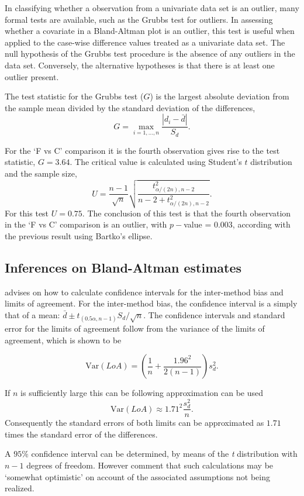 \documentclass[12pt, a4paper]{report}
\begin{document}
	In classifying whether a observation from a univariate data set is
	an outlier, many formal tests are available, such as the Grubbs test for outliers. In assessing
	whether a covariate in a Bland-Altman plot is an outlier, this
	test is useful when applied to the case-wise difference values treated as a
	univariate data set. The null hypothesis of the Grubbs test procedure is the absence
	of any outliers in the data set. Conversely, the alternative hypotheses is that there is at least one outlier
	present.
	
	The test statistic for the Grubbs test ($G$) is the largest
	absolute deviation from the sample mean divided by the standard
	deviation of the differences,
	\[
	G =  \displaystyle\max_{i=1,\ldots, n}\frac{\left \vert d_i -
		\bar{d}\right\vert}{S_{d}}.
	\]
	
	For the `F vs C' comparison it is the fourth observation gives
	rise to the test statistic, $G = 3.64$. The critical value is
	calculated using Student's $t$ distribution and the sample size,
	\[
	U = \frac{n-1}{\sqrt{n}} \sqrt{\frac{t_{\alpha/(2n),n-2}^2}{n - 2
			+ t_{\alpha/(2n),n-2}^2}}.
	\]
	For this test $U = 0.75$. The conclusion of this test is that the fourth observation in the `F vs C' comparison is an outlier, with $p-$value = 0.003, according with the previous result using Bartko's ellipse.
	
	\newpage
	
	
	
	\subsection{Inferences on Bland-Altman estimates}
	\citet*{BA99}advises on how to calculate confidence intervals for the inter-method bias and limits of agreement.
	For the inter-method bias, the confidence interval is a simply that of a mean: $\bar{d} \pm t_{(0.5\alpha,n-1)} S_{d}/\sqrt{n}$.
	The confidence
	intervals and standard error for the limits of agreement follow from the variance of the limits of agreement, which is shown to be
	
	\[
	\mbox{Var}(LoA) = (\frac{1}{n}+\frac{1.96^{2}}{2(n-1)})s_{d}^{2}.
	\]
	
	If $n$ is sufficiently large this can be following approximation
	can be used
	\[
	\mbox{Var}(LoA) \approx 1.71^{2}\frac{s_{d}^{2}}{n}.
	\]
	Consequently the standard errors of both limits can be
	approximated as $1.71$ times the standard error of the
	differences.
	
	A $95\%$ confidence interval can be determined, by means of the
	\emph{t} distribution with $n-1$ degrees of freedom. However \citet*{BA99} comment that such calculations  may be `somewhat optimistic' on account of the associated assumptions not being realized.
	
\end{document}
